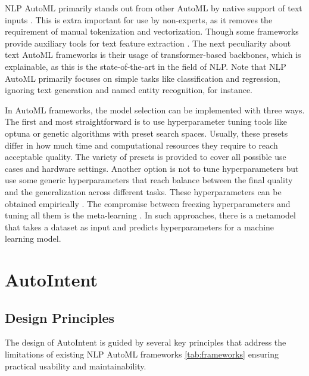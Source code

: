 NLP AutoML primarily stands out from other AutoML by native support of text inputs \cite{tang2024autogluonmultimodalautommsuperchargingmultimodal,vakhrushev2022lightautomlautomlsolutionlarge}. This is extra important for use by non-experts, as it removes the requirement of manual tokenization and vectorization. Though some frameworks provide auxiliary tools for text feature extraction \cite{ledell2020h2o}. The next peculiarity about text AutoML frameworks is their usage of transformer-based backbones, which is explainable, as this is the state-of-the-art in the field of NLP. Note that NLP AutoML primarily focuses on simple tasks like classification and regression, ignoring text generation and named entity recognition, for instance.

In AutoML frameworks, the model selection can be implemented with three ways. The first and most straightforward is to use hyperparameter tuning tools like optuna \cite{akiba2019optuna} or genetic algorithms \cite{feurer2022autosklearn20handsfreeautoml} with preset search spaces. Usually, these presets differ in how much time and computational resources they require to reach acceptable quality. The variety of presets is provided to cover all possible use cases and hardware settings. Another option is not to tune hyperparameters but use some generic hyperparameters that reach balance between the final quality and the generalization across different tasks. These hyperparameters can be obtained empirically \cite{tang2024autogluonmultimodalautommsuperchargingmultimodal}. The compromise between freezing hyperparameters and tuning all them is the meta-learning \cite{Desai2022,feurer2022autosklearn20handsfreeautoml,wang2021meta,tian2022meta,huisman2021survey}. In such approaches, there is a metamodel that takes a dataset as input and predicts hyperparameters for a machine learning model.

\section{AutoIntent}

\subsection{Design Principles}

The design of AutoIntent is guided by several key principles that address the limitations of existing NLP AutoML frameworks \ref{tab:frameworks} ensuring practical usability and maintainability.

